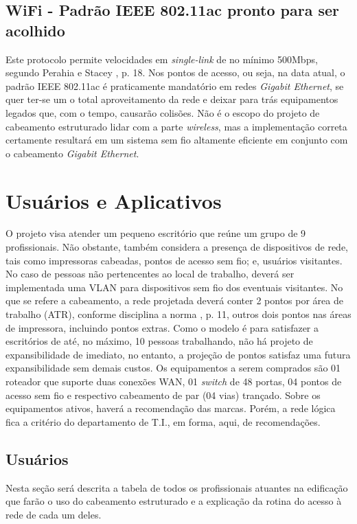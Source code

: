 \documentclass[	DIV=calc,%
							paper=a4,%
							fontsize=12pt,%
							onecolumn]{scrartcl}	 					%
\begin{document}
\subsection{WiFi - Padrão IEEE 802.11ac pronto para ser acolhido}
Este protocolo permite velocidades em \textit{single-link} de no mínimo 500Mbps, segundo Perahia e Stacey \cite{perahia2013next}, p. 18. Nos pontos de acesso, ou seja, na data atual, o padrão IEEE 802.11ac é praticamente mandatório em redes \textit{Gigabit Ethernet}, se quer ter-se um o total aproveitamento da rede e deixar para trás equipamentos legados que, com o tempo, causarão colisões. Não é o escopo do projeto de cabeamento estruturado lidar com a parte \textit{wireless}, mas a implementação correta certamente resultará em um sistema sem fio altamente eficiente em conjunto com o cabeamento \textit{Gigabit Ethernet}.


\section{Usuários e Aplicativos}
O projeto visa atender um pequeno escritório que reúne um grupo de 9 profissionais. Não obstante, também considera a presença de dispositivos de rede, tais como impressoras cabeadas, pontos de acesso sem fio; e, usuários visitantes. No caso de pessoas não pertencentes ao local de trabalho, deverá ser implementada uma VLAN para dispositivos sem fio dos eventuais visitantes. No que se refere a cabeamento, a rede projetada deverá conter 2 pontos por área de trabalho (ATR), conforme disciplina a norma \cite{abnt14565}, p. 11, outros dois pontos nas áreas de impressora, incluindo pontos extras. Como o modelo é para satisfazer a escritórios de até, no máximo, 10 pessoas trabalhando, não há projeto de expansibilidade de imediato, no entanto, a projeção de pontos satisfaz uma futura expansibilidade sem demais custos. Os equipamentos a serem comprados são 01 roteador que suporte duas conexões WAN, 01 \textit{switch} de 48 portas, 04 pontos de acesso sem fio e respectivo cabeamento de par (04 vias) trançado. Sobre os equipamentos ativos, haverá a recomendação das marcas. Porém, a rede lógica fica a critério do departamento de T.I., em forma, aqui, de recomendações.

\subsection{Usuários}

Nesta seção será descrita a tabela de todos os profissionais atuantes na edificação que farão o uso do cabeamento estruturado e a explicação da rotina do acesso à rede de cada um deles.
\end{document}
